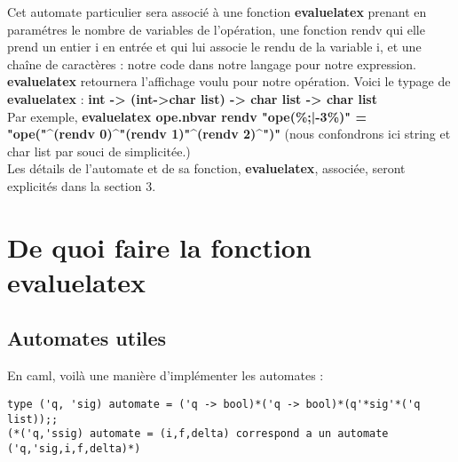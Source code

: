 \documentclass{article}
\theoremstyle{definition}
\begin{document}
Cet automate particulier sera associ\'e \`a une fonction \textbf{evaluelatex} prenant en param\'etres le nombre de variables de l'op\'eration, une fonction rendv qui elle prend un entier i en entr\'ee et qui lui associe le rendu de la variable i, et une cha\^ine de caract\`eres : notre code dans notre langage pour notre expression. \textbf{evaluelatex} retournera l'affichage voulu pour notre op\'eration. 
Voici le typage de \textbf{evaluelatex} : \textbf{int -> (int->char list) -> char list -> char list}\\ 
Par exemple, \textbf{evaluelatex ope.nbvar rendv "ope(\%;|-3\%)" = "ope("\^{}(rendv 0)\^{}"(rendv 1)"\^{}(rendv 2)\^{}")"} (nous confondrons ici string et char list par souci de simplicit\'ee.)\\
Les d\'etails de l'automate et de sa fonction, \textbf{evaluelatex}, associ\'ee, seront explicit\'es dans la section 3.

\section{De quoi faire la fonction \textbf{evaluelatex}}
\subsection{Automates utiles}
En caml, voilà une manière d'implémenter les automates : 

\begin{lstlisting}
type ('q, 'sig) automate = ('q -> bool)*('q -> bool)*(q'*sig'*('q list));;
(*('q,'ssig) automate = (i,f,delta) correspond a un automate ('q,'sig,i,f,delta)*)
\end{lstlisting}
\end{document}

